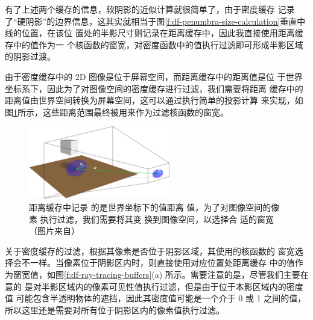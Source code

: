 有了上述两个缓存的信息，软阴影的近似计算就很简单了，由于密度缓存 记录了“硬阴影”的边界信息，这其实就相当于图\ref{f:df-penumbra-size-calculation}垂直中线的位置，在该位 置处的半影尺寸则记录在距离缓存中，因此我直接使用距离缓存中的值作为一 个核函数的窗宽，对密度函数中的值执行过滤即可形成半影区域的阴影过渡。

由于密度缓存中的 2D 图像是位于屏幕空间，而距离缓存中的距离值是位 于世界坐标系下，因此为了对图像空间的密度缓存进行过滤，我们需要将距离 缓存中的距离值由世界空间转换为屏幕空间，这可以通过执行简单的投影计算 来实现，如图\ref{f:df-kernel-width-section}所示，这些距离范围最终被用来作为过滤核函数的窗宽。

\begin{figure}
\sidecaption
	\includegraphics[width=0.55\textwidth]{figures/shadows/kernel-width-section}
	\caption{距离缓存中记录 的是世界坐标下的值距离 值，为了对图像空间的像素 执行过滤，我们需要将其变 换到图像空间，以选择合 适的窗宽（图片来自\cite{a:Implementingfastraytracedsoftshadowsinagameengine}）}
	\label{f:df-kernel-width-section}
\end{figure}

关于密度缓存的过滤，根据其像素是否位于阴影区域，其使用的核函数的 窗宽选择会不一样。当像素位于阴影区内时，则直接使用对应位置处距离缓存 中的值作为窗宽值，如图\ref{f:df-ray-tracing-buffers}(a) 所示。需要注意的是，尽管我们主要在意的 是对半影区域内的像素可见性值执行过滤，但是由于位于本影区域内的密度值 可能包含半透明物体的遮挡，因此其密度值可能是一个介于 0 或 1 之间的值， 所以这里还是需要对所有位于阴影区内的像素值执行过滤。

